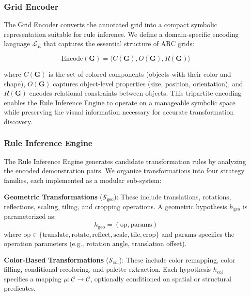 \documentclass[conference,10pt,letterpaper]{IEEEtran}
\begin{document}
\subsubsection{Grid Encoder}

The Grid Encoder converts the annotated grid into a compact symbolic representation suitable for rule inference. We define a domain-specific encoding language $\mathcal{L}_E$ that captures the essential structure of ARC grids:

\begin{equation}
    \text{Encode}(\mathbf{G}) = \langle C(\mathbf{G}), O(\mathbf{G}), R(\mathbf{G}) \rangle
\end{equation}

where $C(\mathbf{G})$ is the set of colored components (objects with their color and shape), $O(\mathbf{G})$ captures object-level properties (size, position, orientation), and $R(\mathbf{G})$ encodes relational constraints between objects. This tripartite encoding enables the Rule Inference Engine to operate on a manageable symbolic space while preserving the visual information necessary for accurate transformation discovery.

\subsubsection{Rule Inference Engine}

The Rule Inference Engine generates candidate transformation rules by analyzing the encoded demonstration pairs. We organize transformations into four strategy families, each implemented as a modular sub-system:

\textbf{Geometric Transformations} ($\mathcal{S}_{\text{geo}}$): These include translations, rotations, reflections, scaling, tiling, and cropping operations. A geometric hypothesis $h_{\text{geo}}$ is parameterized as:
\begin{equation}
    h_{\text{geo}} = (\text{op}, \text{params})
\end{equation}
where $\text{op} \in \{\text{translate}, \text{rotate}, \text{reflect}, \text{scale}, \text{tile}, \text{crop}\}$ and $\text{params}$ specifies the operation parameters (e.g., rotation angle, translation offset).

\textbf{Color-Based Transformations} ($\mathcal{S}_{\text{col}}$): These include color remapping, color filling, conditional recoloring, and palette extraction. Each hypothesis $h_{\text{col}}$ specifies a mapping $\mu: \mathcal{C} \to \mathcal{C}$, optionally conditioned on spatial or structural predicates.
\end{document}
